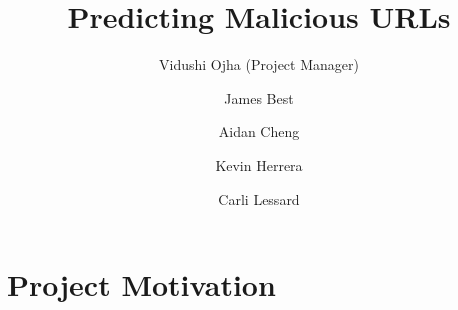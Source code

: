 \documentclass[cs,proposal]{hmcclinic}
\title{Predicting Malicious URLs}
\author{Vidushi Ojha (Project Manager) \and James Best \and Aidan Cheng \and Kevin Herrera \and Carli Lessard}
\begin{document}

\maketitle

\tableofcontents








\newpage


\section{Project Motivation}
\end{document}
